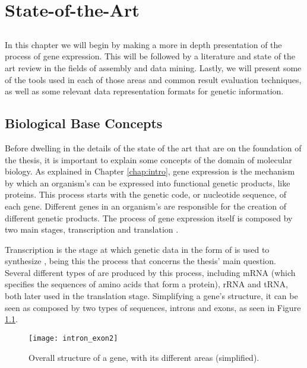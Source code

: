 \chapter{State-of-the-Art} \label{chap:sota}

\section*{}

In this chapter we will begin by making a more in depth presentation of the
process of gene expression. This will be followed by a literature and state of
the art review in the fields of \trans{} assembly and data mining.
Lastly, we will present some of the tools used in each of those areas and
common result evaluation techniques, as well as some relevant data
representation formats for genetic information.

\section{Biological Base Concepts}

Before dwelling in the details of the state of the art that are on the
foundation of the thesis, it is important to explain some concepts of the
domain of molecular biology. As explained in Chapter \ref{chap:intro}, gene
expression is the mechanism by which an organism's \dna{} can be expressed into
functional genetic products, like proteins. This process starts with the
genetic code, or nucleotide sequence, of each gene. Different genes in an
organism's \dna{} are responsible for the creation of different genetic
products. The process of gene expression itself is composed by two main stages,
transcription and translation \cite{leic:gene_expr}.

Transcription is the stage at which genetic data in the form of \dna{} is used
to synthesize \rna{}, being this the process that concerns the thesis' main
question. Several different types of \rna{} are produced by this process,
including mRNA (which specifies the sequences of amino acids that form a
protein), rRNA and tRNA, both later used in the translation stage. Simplifying
a gene's structure, it can be seen as composed by two types of sequences,
introns and exons, as seen in Figure \ref{fig:intron_exon}.

\begin{figure}[!htb]
  \begin{center}
    \leavevmode
    \texttt{[image: intron\_exon2]}
    \caption[Overall structure of a gene]{Overall structure of a gene, with its
    different areas (simplified).}
    \label{fig:intron_exon}
  \end{center}
\end{figure}

